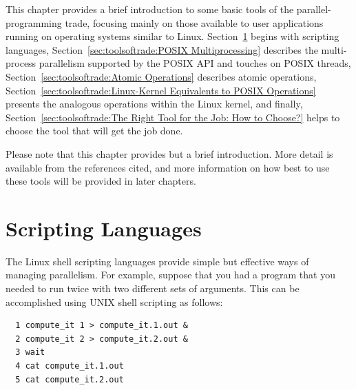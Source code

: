

This chapter provides a brief introduction to some basic tools of the
parallel-programming trade, focusing mainly on those available to
user applications running on operating systems similar to Linux.
Section~\ref{sec:toolsoftrade:Scripting Languages} begins with
scripting languages,
Section~\ref{sec:toolsoftrade:POSIX Multiprocessing}
describes the multi-process parallelism supported by the POSIX API and
touches on POSIX threads,
Section~\ref{sec:toolsoftrade:Atomic Operations}
describes atomic operations,
Section~\ref{sec:toolsoftrade:Linux-Kernel Equivalents to POSIX Operations}
presents the analogous operations within the Linux kernel, and finally,
Section~\ref{sec:toolsoftrade:The Right Tool for the Job: How to Choose?}
helps to choose the tool that will get the job done.

Please note that this chapter provides but a brief introduction.
More detail is available from the references cited, and more information
on how best to use these tools will be provided in later chapters.

\section{Scripting Languages}
\label{sec:toolsoftrade:Scripting Languages}

The Linux shell scripting languages provide simple but effective ways
of managing parallelism.
For example, suppose that you had a program 
that you needed to run twice with two different sets of arguments.
This can be accomplished using UNIX shell scripting as follows:

\vspace{5pt}
\begin{minipage}[t]{\columnwidth}
\scriptsize
\begin{verbatim}
  1 compute_it 1 > compute_it.1.out &
  2 compute_it 2 > compute_it.2.out &
  3 wait
  4 cat compute_it.1.out
  5 cat compute_it.2.out
\end{verbatim}
\end{minipage}
\vspace{5pt}

